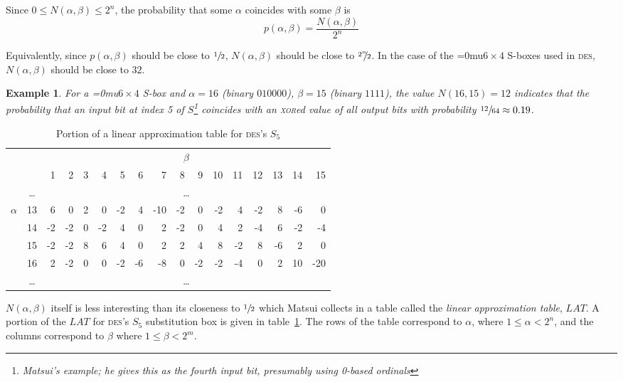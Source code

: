 \documentclass[a4paper,10pt,twoside,openright]{book}
\renewcommand{\sc}[1]{\textsc{\lowercase{#1}}}
\newcommand{\N}{N(\alpha,\beta)}
\newtheorem{example}[theorem]{Example}
\newcommand*\sixbyfour{\begingroup\medmuskip=0mu\relax$6 \times 4$\endgroup}
\begin{document}
Since $0 \leq \N \leq 2^n$, the probability that some $\alpha$ coincides with some $\beta$ is \[p(\alpha, \beta) = \frac{\N}{2^n}\]

Equivalently, since $p(\alpha,\beta)$ should be close to $\sfrac{1}{2}$, $\N$ should be close to $\sfrac{{2^n}\hspace{-0.4em}}{2}$. In the case of the \sixbyfour{} S-boxes used in \sc{DES}, $\N$ should be close to $32$.

\begin{example}
\label{ex:lat-entry} For a \sixbyfour{} S-box and $\alpha = 16$ (binary $010000$), $\beta = 15$ (binary $1111$), the value $N(16, 15) = 12$ indicates that the probability that an input bit at index 5 of $S$\footnote{Matsui's example; he gives this as the fourth input bit, presumably using 0-based ordinals} coincides with an \sc{XOR}ed value of all output bits with probability $\sfrac{12}{64} \approx 0.19$.
\end{example}

\begin{table}
    \begin{tabular}{cc|rrrrrrrrrrrrrrr}
    \multicolumn{2}{c|}{} & \multicolumn{15}{c}{$\beta$} \\
	&	&	1 & 2 & 3 & 4 & 5 & 6 & 7 & 8 & 9 & 10 & 11 & 12 & 13 & 14 & 15 \\
\hline
	&	\ldots & \multicolumn{15}{c}{\ldots} \\
\multirow{4}{*}{$\alpha$}
	&	13	&	6	&	0	&	2	&	0	&	-2	&	4	&	-10	&	-2	&	0	&	-2	&	4	&	-2	&	8	&	-6	&	0	\\
	&	14	&	-2	&	-2	&	0	&	-2	&	4	&	0	&	2	&	-2	&	0	&	4	&	2	&	-4	&	6	&	-2	&	-4	\\
	&	15	&	-2	&	-2	&	8	&	6	&	4	&	0	&	2	&	2	&	4	&	8	&	-2	&	8	&	-6	&	2	&	0	\\
	&	16	&	2	&	-2	&	0	&	0	&	-2	&	-6	&	-8	&	0	&	-2	&	-2	&	-4	&	0	&	2	&	10	&	-20	\\
	&	\ldots & \multicolumn{15}{c}{\ldots} \\
    \end{tabular}
    \caption[Example linear approximation table]{Portion of a linear approximation table for \sc{DES}'s $S_5$}
    \label{tab:lat}
\end{table}

$\N$ itself is less interesting than its closeness to $\sfrac{1}{2}$ which Matsui collects in a table called the \textit{linear approximation table}, $\mathit{LAT}$. A portion of the $\mathit{LAT}$ for \sc{DES}'s $S_5$ substitution box is given in table~\ref{tab:lat}. The rows of the table correspond to $\alpha$, where $1 \leq \alpha < 2^n$, and the columns correspond to $\beta$ where $1 \leq \beta < 2^m$. 
\end{document}
